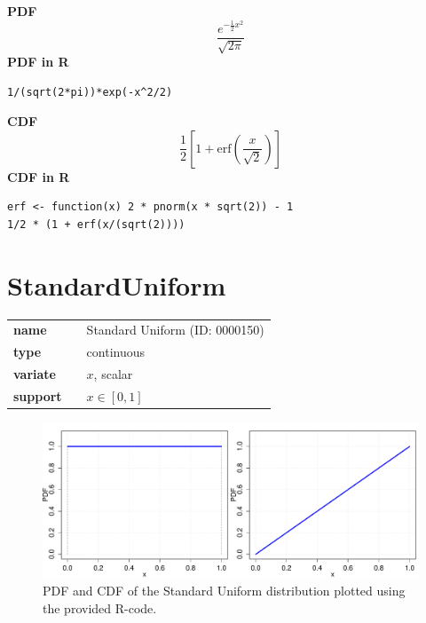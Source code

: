\smallskip \noindent \hspace{.2cm} \textbf{PDF} 
\begin{equation*}\frac{e^{-\frac{1}{2} x^2}}{\sqrt{2\pi}}\end{equation*}
\smallskip \noindent \hspace{.2cm} \textbf{PDF in R}  
\begin{verbatim}1/(sqrt(2*pi))*exp(-x^2/2)\end{verbatim}
\smallskip \noindent \hspace{.2cm} \textbf{CDF} 
\begin{equation*}\frac12\left[1 + \text{erf}\left( \frac{x}{\sqrt{2}}\right)\right]\end{equation*}
\smallskip \noindent \hspace{.2cm} \textbf{CDF in R} 
\begin{verbatim}
erf <- function(x) 2 * pnorm(x * sqrt(2)) - 1
1/2 * (1 + erf(x/(sqrt(2))))\end{verbatim}
\smallskip\section*{StandardUniform} 

  \bigskip 

\begin{tabular}{p{2cm}cl}
\textbf{name} & & Standard Uniform (ID: 0000150)\\ 
 
\textbf{type} & & continuous \\ 

\textbf{variate} & & $x$, scalar \\ 

\textbf{support} & & $x \in [0,1]$
\end{tabular}

\begin{figure}[htb!]
\centering
  \includegraphics[width=140mm]{pics/StandardUniform_pdf_cdf}
 \caption{PDF and CDF of the Standard Uniform distribution plotted using the provided R-code.}
 \label{fig:StandardUniformpdfcdf}
\end{figure}

